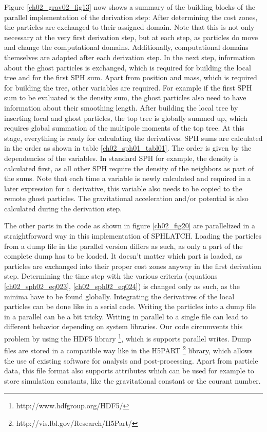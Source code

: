 Figure \ref{ch02_grav02_fig13} now shows a summary of the building blocks of the parallel implementation of the derivation step: After determining the cost zones, the particles are exchanged to their assigned domain. Note that this is not only necessary at the very first derivation step, but at each step, as particles do move and change the computational domains. Additionally, computational domains themselves are adapted after each derivation step. In the next step, information about the ghost particles is exchanged, which is required for building the local tree and for the first SPH sum. Apart from position and mass, which is required for building the tree, other variables are required. For example if the first SPH sum to be evaluated is the density sum, the ghost particles also need to have information about their smoothing length. After building the local tree by inserting local and ghost particles, the top tree is globally summed up, which requires global summation of the multipole moments of the top tree. At this stage, everything is ready for calculating the derivatives. SPH sums are calculated in the order as shown in table \ref{ch02_sph01_tabl01}. The order is given by the dependencies of the variables. In standard SPH for example, the density is calculated first, as all other SPH require the density of the neighbors as part of the sums. Note that each time a variable is newly calculated and required in a later expression for a derivative, this variable also needs to be copied to the remote ghost particles. The gravitational acceleration and/or potential is also calculated during the derivation step.

The other parts in the code as shown in figure \ref{ch02_fig20} are parallelized in a straightforward way in this implementation of SPHLATCH. Loading the particles from a dump file in the parallel version differs as such, as only a part of the complete dump has to be loaded. It doesn't matter which part is loaded, as particles are exchanged into their proper cost zones anyway in the first derivation step. Determining the time step with the various criteria (equations \ref{ch02_sph02_eq023}, \ref{ch02_sph02_eq024}) is changed only as such, as the minima have to be found globally. Integrating the derivatives of the local particles can be done like in a serial code. Writing the particles into a dump file in a parallel can be a bit tricky. Writing in parallel to a single file can lead to different behavior depending on system libraries. Our code circumvents this problem by using the HDF5 library \footnote{http://www.hdfgroup.org/HDF5/}, which is supports parallel writes. Dump files are stored in a compatible way like in the H5PART \footnote{http://vis.lbl.gov/Research/H5Part/} library, which allows the use of existing software for analysis and post-processing. Apart from particle data, this file format also supports attributes which can be used for example to store simulation constants, like the gravitational constant or the courant number.


